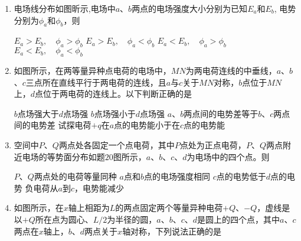 \begin{enumerate}[leftmargin=0em]
\item
{}
电场线分布如图昕示,电场中$ a $、$ b $两点的电场强度大小分别为已知$ E_a $和$ E_b $, 电势分别为$ \phi _ a $和$ \phi_b $，则  
\begin{figure}[h!]
\centering

\end{figure}
\fourchoices
{$E _ { a } > E _ { b } , \quad \phi _ { a } > \phi _ { b }$}
{$E _ { a } > E _ { b } , \quad \phi _ { a } < \phi _ { b }$}
{$E _ { a } < E _ { b } , \quad \phi _ { a } > \phi _ { b }$}
{$E _ { a } < E _ { b } , \quad \phi _ { a } < \phi _ { b }$}





\item
{}
如图所示，在两等量异种点电荷的电场中，$ MN $为两电荷连线的中垂线，$ a $、$ b $、$ c $三点所在直线平行于两电荷的连线，且$ a $与$ c $关于$ MN $对称，$ b $点位于$ MN $上，$ d $点位于两电荷的连线上。以下判断正确的是  
\begin{figure}[h!]
\centering

\end{figure}


\fourchoices
{$ b $点场强大于$ d $点场强 }
{$ b $点场强小于$ d $点场强}
{$ a $、$ b $两点间的电势差等于$ b $、$ c $两点间的电势差}
{试探电荷$ +q $在$ a $点的电势能小于在$ c $点的电势能}





\item
{}
空间中$ P $、$ Q $两点处各固定一个点电荷，其中$ P $点处为正点电荷，$ P $、$ Q $两点附近电场的等势面分布如题$ 20 $图所示，$ a $、$ b $、$ c $、$ d $为电场中的四个点。则  
\begin{figure}[h!]
\centering

\end{figure}


\fourchoices
{$ P $、$ Q $两点处的电荷等量同种}
{$ a $点和$ b $点的电场强度相同}
{$ c $点的电势低于$ d $点的电势}
{负电荷从$ a $到$ c $，电势能减少}




\item
{}
如图所示，在$ x $轴上相距为$ L $的两点固定两个等量异种电荷$ +Q $、$ -Q $，虚线是以$ +Q $所在点为圆心、$ L/2 $为半径的圆，$ a $、$ b $、$ c $、$ d $是圆上的四个点，其中$ a $、$ c $两点在$ x $轴上，$ b $、$ d $两点关于$ x $轴对称，下列说法正确的是  
\begin{figure}[h!]
\centering

\end{figure}



\end{enumerate}
